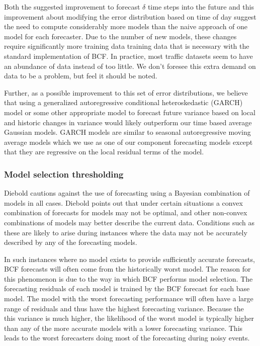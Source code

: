 Both the suggested improvement to forecast $\delta$ time steps into the future and this improvement about modifying the error distribution based on time of day suggest the need to compute considerably more models than the naive approach of one model for each forecaster.  Due to the number of new models, these changes require significantly more training data training data that is necessary with the standard implementation of BCF.  In practice, most traffic datasets seem to have an abundance of data instead of too little.  We don't foresee this extra demand on data to be a problem, but feel it should be noted.

Further, as a possible improvement to this set of error distributions, we believe that using a generalized autoregressive conditional heteroskedastic (GARCH) model \cite{Box2008} or some other appropriate model to forecast future variance based on local and historic changes in variance would likely outperform our time based average Gaussian models.  GARCH models are similar to seasonal autoregressive moving average models which we use as one of our component forecasting models except that they are regressive on the local residual terms of the model.

\subsubsection{Model selection thresholding}
Diebold \cite{Diebold1991} cautions against the use of forecasting using a Bayesian combination of models in all cases.  Diebold points out that under certain situations a convex combination of forecasts for models may not be optimal, and other non-convex combinations of models may better describe the current data.  Conditions such as these are likely to arise during instances where the data may not be accurately described by any of the forecasting models.  

In such instances where no model exists to provide sufficiently accurate forecasts, BCF forecasts will often come from the historically worst model.  The reason for this phenomenon is due to the way in which BCF performs model selection.  The forecasting residuals of each model is trained by the BCF forecast for each base model.  The model with the worst forecasting performance will often have a large range of residuals and thus have the highest forecasting variance.  Because the this variance is much higher, the likelihood of the worst model is typically higher than any of the more accurate models with a lower forecasting variance.  This leads to the worst forecasters doing most of the forecasting during noisy events.  

